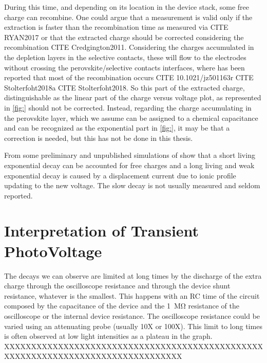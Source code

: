 During this time, and depending on its location in the device stack, some free charge can recombine. One could argue that a  measurement is valid only if the extraction is faster than the recombination time as measured via CITE RYAN2017 or that the extracted charge should be corrected considering the recombination CITE Credgington2011. Considering the charges accumulated in the depletion layers in the selective contacts, these will flow to the electrodes without crossing the perovskite/selective contacts interfaces, where has been reported that most of the recombination occurs CITE 10.1021/jz501163r CITE Stolterfoht2018a CITE Stolterfoht2018. So this part of the extracted charge, distinguishable as the linear part of the charge versus voltage plot, as represented in \cref{fig:} should not be corrected. Instead, regarding the charge accumulating in the perovskite layer, which we assume can be assigned to a chemical capacitance and can be recognized as the exponential part in \cref{fig:}, it may be that a correction is needed, but this has not be done in this thesis.

From some preliminary and unpublished simulations of  show that a short living exponential decay can be accounted for free charges and a long living and weak exponential decay is caused by a displacement current due to ionic profile updating to the new voltage. The slow decay is not usually measured and seldom reported\cite{ORegan2015b}.



\section{Interpretation of Transient PhotoVoltage}\label{interpretation_tpv}

The decays we can observe are limited at long times by the discharge of the extra charge through the oscilloscope resistance and through the device shunt resistance, whatever is the smallest. This happens with an RC time of the circuit composed by the capacitance of the device and the \SI{1}{\Mohm} resistance of the oscilloscope or the internal device resistance. The oscilloscope resistance could be varied using an attenuating probe (usually 10X or 100X). This limit to long times is often observed at low light intensities as a plateau in the  graph. XXXXXXXXXXXXXXXXXXXXXXXXXXXXXXXXXXXXXXXXXXXXXXXXXXXXXXXXXXXXXXXXXXXXXXXXXXXXXXXXX

